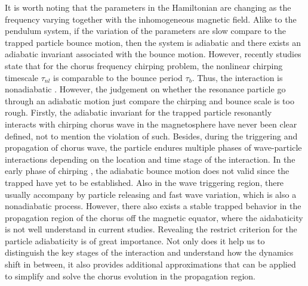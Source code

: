 It is worth noting that the parameters in the Hamiltonian are changing as the frequency varying together with the inhomogeneous magnetic field.
Alike to the pendulum system, if the variation of the parameters are slow compare to the trapped particle bounce motion, then the system is adiabatic and there exists an adiabatic invariant associated with the bounce motion.
However, recently studies state that for the chorus frequency chirping problem, the nonlinear chirping timescale $\tau_{nl}$ is comparable to the bounce period $\tau_{b}$. Thus, the interaction is nonadiabatic \cite{tao2017a,tao2017b}. 
However, the judgement on whether the resonance particle go through an adiabatic motion just compare the chirping and bounce scale is too rough.
Firstly, the adiabatic invariant for the trapped particle resonantly interacts with chirping chorus wave in the magnetosphere have never been clear defined, not to mention the violation of such.
Besides, during the triggering and propagation of chorus wave, the particle endures multiple phases of wave-particle interactions depending on the location and time stage of the interaction.
In the early phase of chirping \cite{bierwage2021}, the adiabatic bounce motion does not valid since the trapped have yet to be established.
Also in the wave triggering region, there usually accompany by particle releasing \cite{tao_trap-release-amplify_2021} and fast wave variation, which is also a nonadiabatic process.
However, there also exists a stable trapped behavior \cite{zheng2024} in the propagation region of the chorus off the magnetic equator, where the aidabaticity is not well understand in current studies. 
Revealing the restrict criterion for the particle adiabaticity is of great importance.
Not only does it help us to distinguish the key stages of the interaction and understand how the dynamics shift in between, it also provides additional approximations that can be applied to simplify and solve the chorus evolution in the propagation region.

